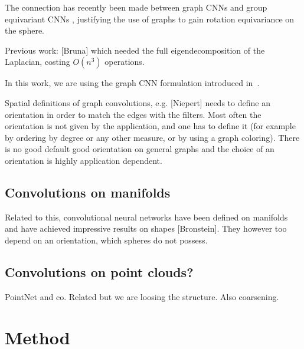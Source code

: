 \documentclass[final,twocolumn,3p,times,authoryear]{elsarticle}
\newcommand{\todo}[1]{{\color[rgb]{.6,.1,.6}{#1}}}
\newcommand{\assign}[1]{{\color[rgb]{.8,.5,.8}{Assigned: #1 }}}
\newcommand{\1}{\b{1}}              %
\newcommand{\0}{\b{0}}              %
\begin{document}
\assign{Michaël}

\todo{other approaches? GNNs, Kipf first order approx, message passing}

The connection has recently been made between graph CNNs and group equivariant CNNs \cite{kondor2018equivariance}, justifying the use of graphs to gain rotation equivariance on the sphere.

Previous work: [Bruna] which needed the full eigendecomposition of the Laplacian, costing $O(n^3)$ operations.

In this work, we are using the graph CNN formulation introduced in~\cite{defferrard2016convolutional}.

Spatial definitions of graph convolutions, e.g. [Niepert] needs to define an orientation in order to match the edges with the filters. Most often the orientation is not given by the application, and one has to define it (for example by ordering by degree or any other measure, or by using a graph coloring). There is no good default good orientation on general graphs and the choice of an orientation is highly application dependent.



\subsection{Convolutions on manifolds}


Related to this, convolutional neural networks have been defined on manifolds and have achieved impressive results on shapes [Bronstein]. They however too depend on an orientation, which spheres do not possess.

\subsection{Convolutions on point clouds?}


PointNet and co. Related but we are loosing the structure. Also coarsening.

\section{Method}
\label{sec:method}
\end{document}
